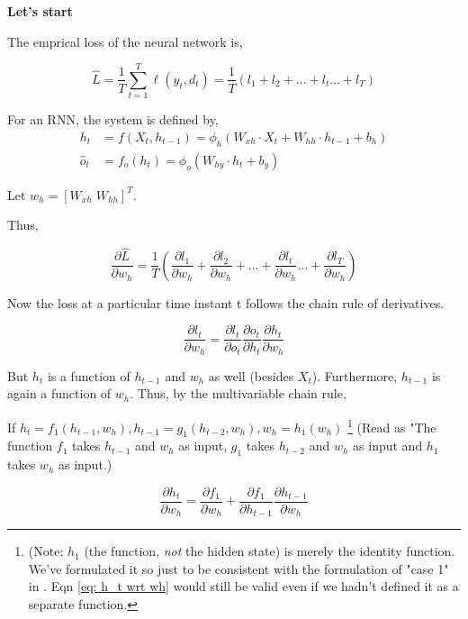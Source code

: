 \documentclass[12pt, letterpaper]{article}
\begin{document}
\textbf{Let's start} 

The emprical loss of the neural network is,

\begin{equation}
    \hat{L} = \frac{1}{T} \sum_{t=1}^{T} \ell(y_t, d_t) = \frac{1}{T} (l_1 + l_2 + ... + l_t ... + l_T)
\end{equation}

For an RNN, the system is defined by,
\begin{align}
    h_{t} &= f (X_{t}, h_{t-1}) = \phi_{h}(W_{xh} \cdot X_{t} + W_{hh}\cdot h_{t-1} +b_{h}) \\
    \hat{o}_{t} &= f_{o}(h_{t}) = \phi_{o}(W_{hy}\cdot h_{t} + b_{y})
\end{align}

Let $w_h = [W_{xh}\;W_{hh}]^T$.

Thus,

\begin{equation}
    \frac{\partial \hat{L}}{\partial w_h} = \frac{1}{T} (\frac{\partial l_1}{\partial w_h} + \frac{\partial l_2}{\partial w_h} + ... + \frac{\partial l_t}{\partial w_h} ... + \frac{\partial l_T}{\partial w_h})
\end{equation}

Now the loss at a particular time instant t follows the chain rule of derivatives.

\begin{equation}
    \frac{\partial l_t}{\partial w_h} = \frac{\partial l_t}{\partial o_t}\frac{\partial o_t}{\partial h_t}\frac{\partial h_t}{\partial w_h}
    \label{eq: l_t}
\end{equation}

But $h_t$ is a function of $h_{t-1}$ and $w_h$ as well (besides $X_t$).
Furthermore, $h_{t-1}$ is again a function of $w_h$.
Thus, by the multivariable chain rule,

If $h_t = f_1(h_{t-1}, w_h), h_{t-1}= g_1(h_{t-2}, w_h), w_h = h_1(w_h)$ \footnote{(Note: $h_1$ (the function, \textit{not} the hidden state) is merely the identity
function. We've formulated it so just to be consistent with the
formulation of "case 1" in \cite{multivariate_chain_rule}. Eqn \ref{eq: h_t wrt wh} would still 
be valid even if we hadn't defined it as a separate function.} (Read as "The function $f_1$ takes 
$h_{t-1}$ and $w_h$ as input, $g_1$ takes $h_{t-2}$ and $w_h$ as input and $h_1$ takes $w_h$ as input.)

\begin{equation}
    \frac{\partial h_t}{\partial w_h} = \frac{\partial f_1}{\partial w_h} + \frac{\partial f_1}{\partial h_{t-1}}\frac{\partial h_{t-1}}{\partial w_h}
    \label{eq: h_t wrt wh}
\end{equation}
\end{document}
